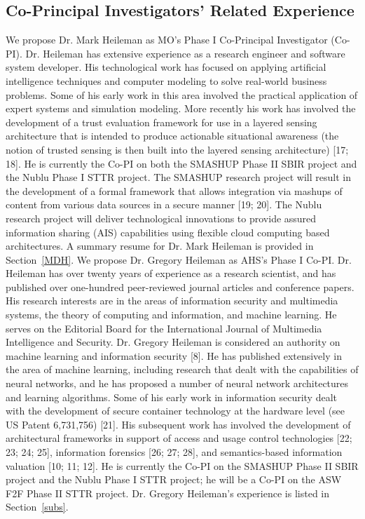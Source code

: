 \documentclass{sbir}
\begin{document}
\subsection{Co-Principal Investigators' Related Experience}
We propose Dr. Mark Heileman as MO's Phase I Co-Principal Investigator (Co-PI). Dr. Heileman has extensive experience as a research engineer and software system developer. His technological work has focused on applying artificial intelligence techniques and computer modeling to solve real-world business problems. Some of his early work in this area involved the practical application of expert systems and simulation modeling. More recently his work has involved the development of a trust evaluation framework for use in a layered sensing architecture that is intended to produce actionable situational awareness (the notion of trusted sensing is then built into the layered sensing architecture) [17; 18]. He is currently the Co-PI on both the SMASHUP Phase II SBIR project and the Nublu Phase I STTR project. The SMASHUP research project will result in the development of a formal framework that allows integration via mashups of content from various data sources in a secure manner [19; 20]. The Nublu research project will deliver technological innovations to provide assured information sharing (AIS) capabilities using flexible cloud computing based architectures. A summary resume for Dr. Mark Heileman is provided in Section~\ref{MDH}.
We propose Dr. Gregory Heileman as AHS's Phase I Co-PI. Dr. Heileman has over twenty years of experience as a research scientist, and has published over one-hundred peer-reviewed journal articles and conference papers. His research interests are in the areas of information security and multimedia systems, the theory of computing and information, and machine learning. He serves on the Editorial Board for the International Journal of Multimedia Intelligence and Security. Dr. Gregory Heileman is considered an authority on machine learning and information security [8]. He has published extensively in the area of machine learning, including research that dealt with the capabilities of neural networks, and he has proposed a number of neural network architectures and learning algorithms. Some of his early work in information security dealt with the development of secure container technology at the hardware level (see US Patent 6,731,756) [21]. His subsequent work has involved the development of architectural frameworks in support of access and usage control technologies [22; 23; 24; 25], information forensics [26; 27; 28], and semantics-based information valuation [10; 11; 12]. He is currently the Co-PI on the SMASHUP Phase II SBIR project and the Nublu Phase I STTR project; he will be a Co-PI on the ASW F2F Phase II STTR project. Dr. Gregory Heileman's experience is listed in Section~\ref{subs}.
\end{document}
